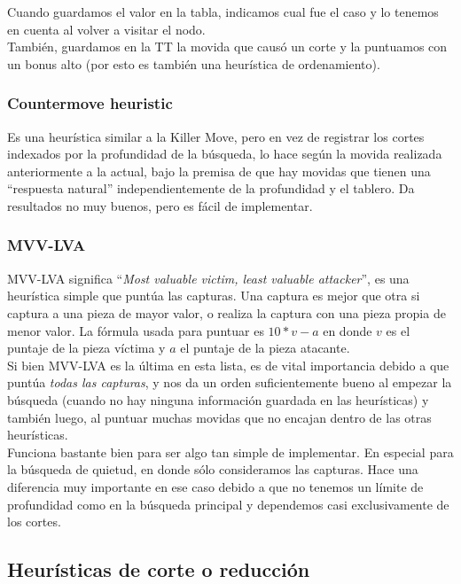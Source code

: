 \documentclass{article}
\begin{document}
Cuando guardamos el valor en la tabla, indicamos cual fue el caso y lo
tenemos en cuenta al volver a visitar el nodo.
\\

También, guardamos en la TT la movida que causó un corte y la
puntuamos con un bonus alto (por esto es también una heurística de
ordenamiento).

\subsubsection{Countermove heuristic}
Es una heurística similar a la Killer Move, pero en vez de registrar
los cortes indexados por la profundidad de la búsqueda, lo hace según
la movida realizada anteriormente a la actual, bajo la premisa de que
hay movidas que tienen una ``respuesta natural'' independientemente de
la profundidad y el tablero. Da resultados no muy buenos, pero es fácil
de implementar.

\subsubsection{MVV-LVA}
MVV-LVA significa ``\emph{Most valuable victim, least valuable
attacker}'', es una heurística simple que puntúa las capturas. Una
captura es mejor que otra si captura a una pieza de mayor valor, o
realiza la captura con una pieza propia de menor valor. La fórmula
usada para puntuar es $10*v - a$ en donde $v$ es el puntaje de la pieza
víctima y $a$ el puntaje de la pieza atacante.
\\

Si bien MVV-LVA es la última en esta lista, es de vital importancia
debido a que puntúa \emph{todas las capturas}, y nos da un orden
suficientemente bueno al empezar la búsqueda (cuando no hay ninguna
información guardada en las heurísticas) y también luego, al puntuar
muchas movidas que no encajan dentro de las otras heurísticas.
\\

Funciona bastante bien para ser algo tan simple de implementar. En
especial para la búsqueda de quietud, en donde sólo consideramos las
capturas. Hace una diferencia muy importante en ese caso debido a que
no tenemos un límite de profundidad como en la búsqueda principal y
dependemos casi exclusivamente de los cortes.

\subsection{Heurísticas de corte o reducción}
\end{document}

